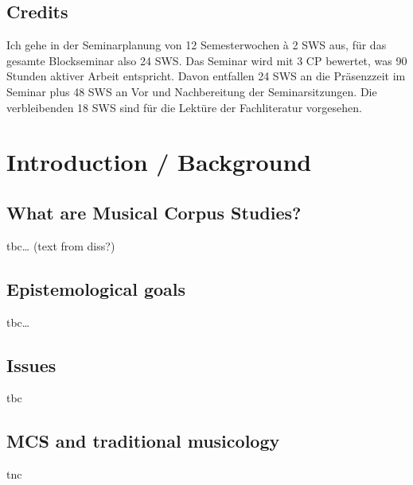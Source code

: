 \documentclass[letterpaper,10pt,english]{sphinxmanual}
\begin{document}
\section{Credits}
\label{\detokenize{orga:credits}}
Ich gehe in der Seminarplanung von 12 Semesterwochen à 2 SWS aus, für das gesamte Blockseminar also 24 SWS.
Das Seminar wird mit 3 CP bewertet, was 90 Stunden aktiver Arbeit entspricht.
Davon entfallen 24 SWS an die Präsenzzeit im Seminar plus 48 SWS an Vor\sphinxhyphen{} und Nachbereitung der Seminarsitzungen.
Die verbleibenden 18 SWS sind für die Lektüre der Fachliteratur vorgesehen.


\chapter{Introduction / Background}
\label{\detokenize{background:introduction-background}}\label{\detokenize{background::doc}}

\section{What are Musical Corpus Studies?}
\label{\detokenize{background:what-are-musical-corpus-studies}}
tbc… (text from diss?)


\section{Epistemological goals}
\label{\detokenize{background:epistemological-goals}}
tbc…


\section{Issues}
\label{\detokenize{background:issues}}
tbc


\section{MCS and traditional musicology}
\label{\detokenize{background:mcs-and-traditional-musicology}}
tnc
\end{document}
